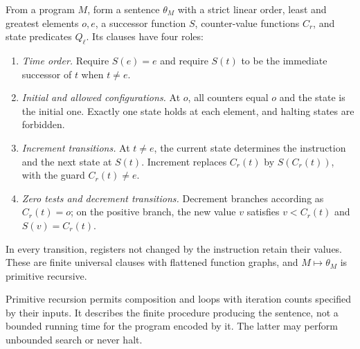 \documentclass[11pt,a4paper]{article}
\theoremstyle{definition}\newtheorem{definition}[theorem]{Definition}
\theoremstyle{remark}\newtheorem{remark}[theorem]{Remark}
\begin{document}
From a program $M$, form a sentence $\theta_M$ with a strict linear order,
least and greatest elements $o,e$, a successor function $S$, counter-value
functions $C_r$, and state predicates $Q_\ell$. Its clauses have four roles:
\begin{enumerate}
\item \emph{Time order.} Require $S(e)=e$ and require $S(t)$ to be
the immediate successor of $t$ when $t\ne e$.
\item \emph{Initial and allowed configurations.} At $o$, all counters
equal $o$ and the state is the initial one. Exactly one state holds
at each element, and halting states are forbidden.
\item \emph{Increment transitions.} At $t\ne e$, the current state
determines the instruction and the next state at $S(t)$. Increment
replaces $C_r(t)$ by $S(C_r(t))$, with the guard $C_r(t)\ne e$.
\item \emph{Zero tests and decrement transitions.} Decrement branches
according as $C_r(t)=o$; on the positive branch, the new value $v$
satisfies $v<C_r(t)$ and $S(v)=C_r(t)$.
\end{enumerate}
In every transition, registers not changed by the instruction retain
their values. These are finite universal clauses with flattened function graphs,
and $M\mapsto\theta_M$ is primitive recursive.

Primitive recursion permits composition and loops with iteration counts
specified by their inputs. It describes the finite procedure producing
the sentence, not a bounded running time for the program encoded by it.
The latter may perform unbounded search or never halt.
\end{document}
